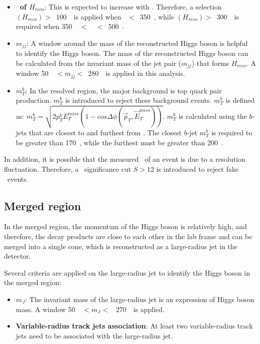 \begin{itemize}
    \item \textbf{\pt~of $H_{reco}$}: This is expected to increase with \met. Therefore, a selection \pt$(H_{reco})>$~100~\GeV~is applied when \met~$<$~350~\GeV, while \pt$(H_{reco}) >$~300~\GeV~is required when 350~\GeV~$<$~\met~$<$~500~\GeV.
    \item \textbf{$m_{jj}$}: A window around the mass of the reconstructed Higgs boson is helpful to identify the Higgs boson. The mass of the reconstructed Higgs boson can be calculated from the invariant mass of the jet pair ($m_{jj}$) that forms $H_{reco}$. A window 50~\GeV~$< m_{jj} <$~280~\GeV~is applied in this analysis. 
    \item \textbf{$m_{T}^{b}$}: In the resolved region, the major background is top quark pair production. $m_{T}^{b}$ is introduced to reject these background events. $m_{T}^{b}$ is defined as: $m_{T}^{b}=\sqrt{2p_{T}^{b}E_{T}^{miss}(1-cos\Delta\phi(\vec{p}_{T}, \vec{E}_{T}^{miss}))}$. $m_{T}^{b}$ is calculated using the $b$-jets that are closest to and furthest from \met. The closest $b$-jet $m_{T}^b$ is required to be greater than 170~\GeV, while the furthest must be greater than 200~\GeV.
\end{itemize}

\par In addition, it is possible that the measured \met~of an event is due to a resolution fluctuation. Therefore, a \met~significance cut $S > 12$ is introduced to reject fake \met~events.

\subsection{Merged region}

\par In the merged region, the momentum of the Higgs boson is relatively high, and therefore, the decay products are close to each other in the lab frame and can be merged into a single cone, which is reconstructed as a large-radius jet in the detector.
\par Several criteria are applied on the large-radius jet to identify the Higgs boson in the merged region:
\begin{itemize}
    \item \textbf{$m_{J}$}: The invariant mass of the large-radius jet is an expression of Higgs boson mass. A window 50~\GeV~$< m_{J} <$ ~270~\GeV~is applied.
    \item \textbf{Variable-radius track jets association}: At least two variable-radius track jets need to be associated with the large-radius jet.
\end{itemize}

